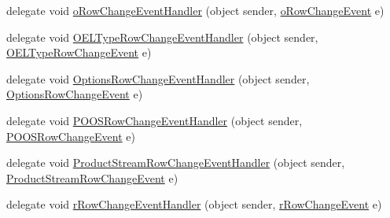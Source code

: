 \begin{DoxyCompactItemize}
\item 
delegate void \hyperlink{class_env_int_1_1_win32_1_1_field_tech_1_1_manager_1_1_data_sets_1_1_guide_ware_mobile_data_set_aa04c239e0bbbba02cb09adcdafb9d5eb}{o\+Row\+Change\+Event\+Handler} (object sender, \hyperlink{class_env_int_1_1_win32_1_1_field_tech_1_1_manager_1_1_data_sets_1_1_guide_ware_mobile_data_set_1_1o_row_change_event}{o\+Row\+Change\+Event} e)
\item 
delegate void \hyperlink{class_env_int_1_1_win32_1_1_field_tech_1_1_manager_1_1_data_sets_1_1_guide_ware_mobile_data_set_a7b6f6097dcc632687fa93021de48da64}{O\+E\+L\+Type\+Row\+Change\+Event\+Handler} (object sender, \hyperlink{class_env_int_1_1_win32_1_1_field_tech_1_1_manager_1_1_data_sets_1_1_guide_ware_mobile_data_set_1_1_o_e_l_type_row_change_event}{O\+E\+L\+Type\+Row\+Change\+Event} e)
\item 
delegate void \hyperlink{class_env_int_1_1_win32_1_1_field_tech_1_1_manager_1_1_data_sets_1_1_guide_ware_mobile_data_set_a1f280d1d79852f0a6b8d9fe599e484d8}{Options\+Row\+Change\+Event\+Handler} (object sender, \hyperlink{class_env_int_1_1_win32_1_1_field_tech_1_1_manager_1_1_data_sets_1_1_guide_ware_mobile_data_set_1_1_options_row_change_event}{Options\+Row\+Change\+Event} e)
\item 
delegate void \hyperlink{class_env_int_1_1_win32_1_1_field_tech_1_1_manager_1_1_data_sets_1_1_guide_ware_mobile_data_set_a7bd082e708384fdec8592f2c19ce7174}{P\+O\+O\+S\+Row\+Change\+Event\+Handler} (object sender, \hyperlink{class_env_int_1_1_win32_1_1_field_tech_1_1_manager_1_1_data_sets_1_1_guide_ware_mobile_data_set_1_1_p_o_o_s_row_change_event}{P\+O\+O\+S\+Row\+Change\+Event} e)
\item 
delegate void \hyperlink{class_env_int_1_1_win32_1_1_field_tech_1_1_manager_1_1_data_sets_1_1_guide_ware_mobile_data_set_ad25fd90b16b6b963a1d750a75c2e32a3}{Product\+Stream\+Row\+Change\+Event\+Handler} (object sender, \hyperlink{class_env_int_1_1_win32_1_1_field_tech_1_1_manager_1_1_data_sets_1_1_guide_ware_mobile_data_set_6d119e1ef5d2632a57332691de4d53e9}{Product\+Stream\+Row\+Change\+Event} e)
\item 
delegate void \hyperlink{class_env_int_1_1_win32_1_1_field_tech_1_1_manager_1_1_data_sets_1_1_guide_ware_mobile_data_set_a827f75a235c1aff22fb429089a4ebdb5}{r\+Row\+Change\+Event\+Handler} (object sender, \hyperlink{class_env_int_1_1_win32_1_1_field_tech_1_1_manager_1_1_data_sets_1_1_guide_ware_mobile_data_set_1_1r_row_change_event}{r\+Row\+Change\+Event} e)
\item 

\end{DoxyCompactItemize}
